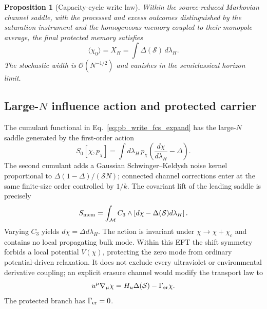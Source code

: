 \documentclass[aps,prd,twocolumn,10pt,superscriptaddress,nofootinbib]{revtex4-2}
\newtheorem{proposition}{Proposition}
\begin{document}
\begin{proposition}[Capacity-cycle write law]
Within the source-reduced Markovian channel saddle, with the processed and
excess outcomes distinguished by the saturation instrument and the
homogeneous memory coupled to their monopole average, the final protected
memory satisfies
\begin{equation}
\boxed{\langle\chi_0\rangle=X_H
=\int\Delta(\mathcal S)\,d\lambda_H.}
\label{eq:pb_write_theorem}
\end{equation}
The stochastic width is $\mathcal O(N^{-1/2})$ and vanishes in the
semiclassical horizon limit.
\end{proposition}

\subsection{Large-$N$ influence action and protected carrier}
\label{sec:pb_write_effective_action}

The cumulant functional in Eq.~\eqref{eq:pb_write_fcs_expand} has the
large-$N$ saddle generated by the first-order action
\begin{equation}
S_{0}[\chi,p_\chi]
=\int d\lambda_H\,p_\chi
\left(\frac{d\chi}{d\lambda_H}-\Delta\right).
\label{eq:pb_counting_action}
\end{equation}
The second cumulant adds a Gaussian Schwinger--Keldysh noise kernel
proportional to
$\Delta(1-\Delta)/(\mathcal S N)$; connected channel corrections enter at
the same finite-size order controlled by $1/k$.  The covariant lift of the
leading saddle is precisely
\begin{equation}
S_{\rm mem}
=\int_{\mathcal M}C_3\wedge
\left[d\chi-\Delta(\mathcal S)d\lambda_H\right].
\label{eq:pb_memory_action}
\end{equation}
Varying $C_3$ yields $d\chi=\Delta d\lambda_H$.  The action is invariant
under $\chi\rightarrow\chi+\chi_c$ and contains no local propagating bulk
mode.  Within this EFT the shift symmetry forbids a local potential
$V(\chi)$, protecting the zero mode from ordinary potential-driven
relaxation.  It does not exclude every ultraviolet or environmental
derivative coupling; an explicit erasure channel would modify the transport
law to
\begin{equation}
u^\mu\nabla_\mu\chi
=H_u\Delta(\mathcal S)-\Gamma_{\rm er}\chi.
\label{eq:pb_memory_transport}
\end{equation}
The protected branch has $\Gamma_{\rm er}=0$.
\end{document}

